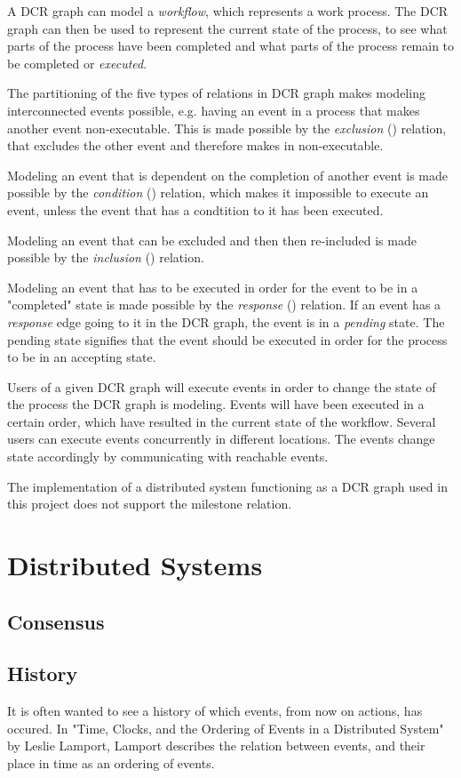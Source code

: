 	A DCR graph can model a \textit{workflow}, which represents a work process. The DCR graph can then be used to represent the current state of the process, to see what parts of the process have been completed and what parts of the process remain to be completed or \textit{executed}. 
	
	The partitioning of the five types of relations in DCR graph makes modeling interconnected events possible, e.g. having an event in a process that makes another event non-executable. This is made possible by the \textit{exclusion} (\exclusion) relation, that excludes the other event and therefore makes in non-executable. 
	
	Modeling an event that is dependent on the completion of another event is made possible by the \textit{condition} (\condition) relation, which makes it impossible to execute an event, unless the event that has a condtition to it has been executed.
	
	Modeling an event that can be excluded and then then re-included is made possible by the \textit{inclusion} (\inclusion) relation. 
	
	Modeling an event that has to be executed in order for the event to be in a "completed" state  is made possible by the \textit{response} (\response) relation. If an event has a \textit{response} edge going to it in the DCR graph, the event is in a \textit{pending} state. The pending state signifies that the event should be executed in order for the process to be in an accepting state.
	
	Users of a given DCR graph will execute events in order to change the state of the process the DCR graph is modeling. Events will have been executed in a certain order, which have resulted in the current state of the workflow. Several users can execute events concurrently in different locations. The events change state accordingly by communicating with reachable events. 
	
	The implementation of a distributed system functioning as a DCR graph used in this project does not support the milestone relation. 
	\section{Distributed Systems}
		\subsection{Consensus}
		\subsection{History}
		It is often wanted to see a history of which events, from now on actions, has occured. In "Time, Clocks, and the Ordering of Events in a Distributed System" by Leslie Lamport, Lamport describes the relation between events, and their place in time as an ordering of events. 
		
